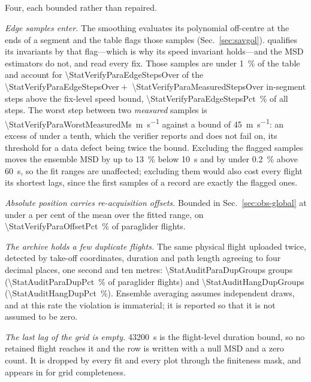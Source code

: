 \subsection{}
\begin{revblock}
Four, each bounded rather than repaired.

\emph{Edge samples enter.} The smoothing evaluates its polynomial off-centre at the ends
of a segment and the table flags those samples  (Sec.~\ref{sec:savgol}).
 qualifies its invariants by that flag---which is why its speed
invariant holds---and the MSD estimators do not, and read every fix. Those samples are
under \SI{1}{\percent} of the table and account for
\num{\StatVerifyParaEdgeStepsOver} of the \num{\StatVerifyParaEdgeStepsOver}${}+{}$%
\num{\StatVerifyParaMeasuredStepsOver} in-segment steps above the fix-level speed bound,
\SI{\StatVerifyParaEdgeStepsPct}{\percent} of all steps. The worst step between two
\emph{measured} samples is \SI{\StatVerifyParaWorstMeasuredMs}{\metre\per\second} against
a bound of \SI{45}{\metre\per\second}: an excess of under a tenth, which the verifier
reports and does not fail on, its threshold for a data defect being twice the bound.
Excluding the flagged samples moves the ensemble MSD by up to \SI{13}{\percent} below
\SI{10}{\second} and by under \SI{0.2}{\percent} above \SI{60}{\second}, so the fit ranges
are unaffected; excluding them would also cost every flight its shortest lags, since the
first samples of a record are exactly the flagged ones.

\emph{Absolute position carries re-acquisition offsets.} Bounded in
Sec.~\ref{sec:obs-global} at under a per cent of the mean over the fitted range, on
\SI{\StatVerifyParaOffsetPct}{\percent} of paraglider flights.

\emph{The archive holds a few duplicate flights.} The same physical flight uploaded
twice, detected by take-off coordinates, duration and path length agreeing to four
decimal places, one second and ten metres: \num{\StatAuditParaDupGroups} groups
(\SI{\StatAuditParaDupPct}{\percent} of paraglider flights) and
\num{\StatAuditHangDupGroups} (\SI{\StatAuditHangDupPct}{\percent}). Ensemble averaging
assumes independent draws, and at this rate the violation is immaterial; it is reported so
that it is not assumed to be zero.

\emph{The last lag of the grid is empty.} \SI{43200}{\second} is the flight-level
duration bound, so no retained flight reaches it and the row is written with a null MSD
and a zero count. It is dropped by every fit and every plot through the finiteness mask,
and appears in  for grid completeness.
\end{revblock}

